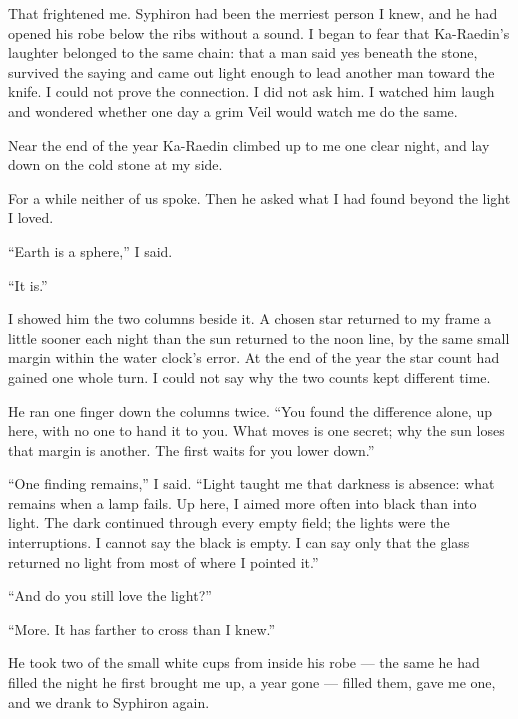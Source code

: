 That frightened me. Syphiron had been the merriest person I knew, and he had opened his robe below the ribs without a sound. I began to fear that Ka-Raedin's laughter belonged to the same chain: that a man said yes beneath the stone, survived the saying and came out light enough to lead another man toward the knife. I could not prove the connection. I did not ask him. I watched him laugh and wondered whether one day a grim Veil would watch me do the same.\par

Near the end of the year Ka-Raedin climbed up to me one clear night, and lay down on the cold stone at my side.

For a while neither of us spoke. Then he asked what I had found beyond the light I loved.\par

``Earth is a sphere,'' I said.\par

``It is.''\par

I showed him the two columns beside it. A chosen star returned to my frame a little sooner each night than the sun returned to the noon line, by the same small margin within the water clock's error. At the end of the year the star count had gained one whole turn. I could not say why the two counts kept different time.\par

He ran one finger down the columns twice. ``You found the difference alone, up here, with no one to hand it to you. What moves is one secret; why the sun loses that margin is another. The first waits for you lower down.''\par

``One finding remains,'' I said. ``Light taught me that darkness is absence: what remains when a lamp fails. Up here, I aimed more often into black than into light. The dark continued through every empty field; the lights were the interruptions. I cannot say the black is empty. I can say only that the glass returned no light from most of where I pointed it.''\par

``And do you still love the light?''\par

``More. It has farther to cross than I knew.''\par

He took two of the small white cups from inside his robe --- the same he had filled the night he first brought me up, a year gone --- filled them, gave me one, and we drank to Syphiron again. \par

